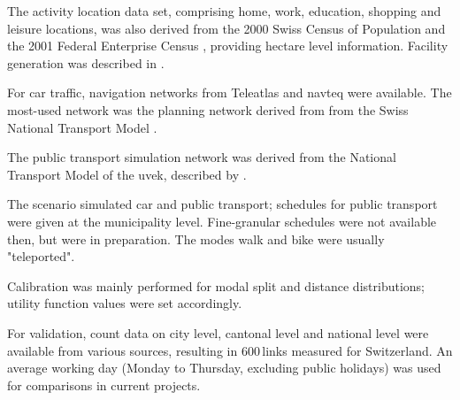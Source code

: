 The activity location data set, comprising home, work, education, shopping and leisure locations, was also derived from the 2000 Swiss Census of Population and the 2001 Federal Enterprise Census \citep[][]{SwissEnterpriseCensus_manual_2001}, providing hectare level information. Facility generation was described in \citet[][p.33]{BalmerEtAl_ResRep_bdktzrh_2009}.

For car traffic, navigation networks from Teleatlas \citep[][]{MultiNet_Webpage_2010} and \gls{navteq} \citep[][]{Navteq_2011} were available. The most-used network was the planning network derived from from the Swiss National Transport Model \citep[][]{VrticEtAl_BiegerEtAl_2003}.

The public transport simulation network was derived from the National Transport Model of the \gls{uvek}, described by \citet[][]{VrticFroehlich_ResRep_UVEK_2010}. 

The scenario simulated car and public transport; schedules for public transport were given at the municipality level. Fine-granular schedules were not available then, but were in preparation. The modes walk and bike were usually "teleported". 

Calibration was mainly performed for modal split and distance distributions; utility function values were set accordingly.

For validation, count data on city level, cantonal level and national level \citep[][]{ASTRA_Webpage_2006} were available from various sources, resulting in 600\,links measured for Switzerland. An average working day (Monday to Thursday, excluding public holidays) was used for comparisons in current projects.

